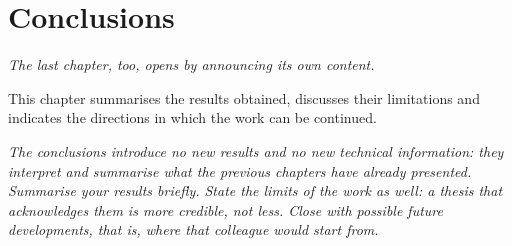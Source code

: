 \documentclass[12pt,a4paper,oneside]{report}
\newcommand{\guida}[1]{{\itshape\color{gray}#1\par}}
\newcommand{\esempio}[1]{#1\par}
\begin{document}
\chapter{Conclusions}
\guida{The last chapter, too, opens by announcing its own content.}
\esempio{This chapter summarises the results obtained, discusses their
limitations and indicates the directions in which the work can be continued.}
\guida{The conclusions introduce no new results and no new technical information: they interpret and summarise what the previous chapters have already presented. Summarise your results briefly. State the limits of the work as well: a thesis that acknowledges them is more credible, not less. Close with possible future developments, that is, where that colleague would start from.}



\end{document}
